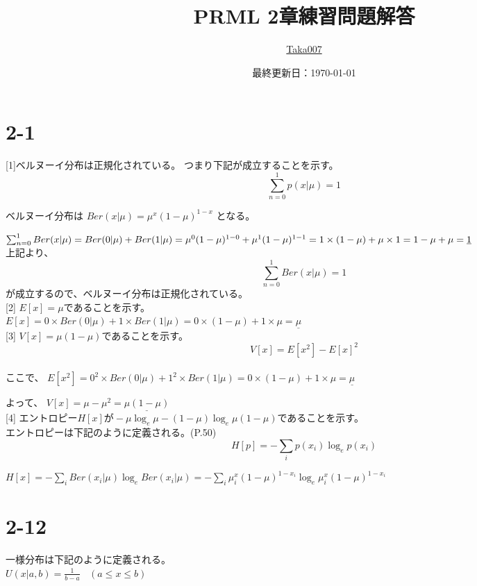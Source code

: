 \documentclass{ltjsarticle}
\title{PRML 2章練習問題解答}
\author{\href{https://github.com/Taka0007}{Taka007}}
\date{最終更新日：\today}
\renewenvironment{leftbar}{%
  \renewcommand\FrameCommand{\vrule width 1pt \hspace{10pt}}%
  \MakeFramed {\advance\hsize-\width \FrameRestore}}%
 {\endMakeFramed}
\newcommand{\barquo}[1]{\begin{leftbar} \noindent #1 \end{leftbar}} %
\begin{document}
\maketitle

\tableofcontents
\newpage

\section*{2-1}
[1]ベルヌーイ分布は正規化されている。
つまり下記が成立することを示す。
$$
\sum_{n=0}^1 p(x| \mu ) = 1
$$

ベルヌーイ分布は
$
Ber(x| \mu) = \mu^x (1-\mu)^{1-x}
$
となる。

$
\sum_{n=0}^1 Ber(x| \mu)
= Ber(0| \mu) + Ber(1| \mu)
= \mu^0 (1-\mu)^{1-0} + \mu^1 (1-\mu)^{1-1}
= 1 \times (1-\mu) + \mu \times 1 \\
= 1-\mu + \mu
= \underline{1}
$
\\
上記より、
$$
\sum_{n=0}^1 Ber(x| \mu) = 1
$$
が成立するので、ベルヌーイ分布は正規化されている。
\\

[2] $E[x] = \mu $であることを示す。\\
$
E[x] = 0 \times Ber(0| \mu) + 1 \times Ber(1| \mu)
= 0 \times (1-\mu) + 1 \times \mu
= \underline{\mu}
$
\\

[3] $V[x] = \mu (1-\mu)$であることを示す。\\
$$
V[x] = E[x^2] - E[x]^2
$$
\\
ここで、
$
E[x^2] = 0^2 \times Ber(0| \mu) + 1^2 \times Ber(1| \mu)
= 0 \times (1-\mu) + 1 \times \mu
= \underline{\mu}
$

よって、
$
V[x] = \mu - \mu^2
= \underline{\mu (1-\mu)}
$
\\

[4] エントロピー$H[x]が-\mu \log_e \mu - (1-\mu) \log_e \mu (1-\mu)$であることを示す。\\

エントロピーは下記のように定義される。(P.50)
$$
H[p] = - \sum_{i} p(x_i) \log_e p(x_i)
$$

$
H[x] = - \sum_{i} Ber(x_i| \mu) \log_e Ber(x_i| \mu)
= - \sum_{i} \mu^x_i (1-\mu)^{1-x_i} \log_e \mu^x_i (1-\mu)^{1-x_i}
$\\

\newpage
\section*{2-12}
一様分布は下記のように定義される。 \\
\barquo{
$
U(x|a,b) = \frac{1}{b-a} \ \ \ \ (a \leq x \leq b)
$
}
\end{document}
